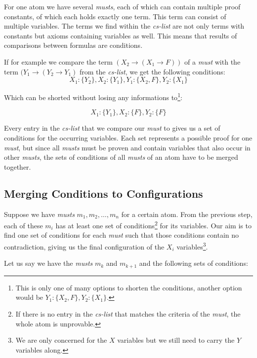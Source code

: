 For one atom we have several \emph{musts}, each of which can contain multiple proof constants, of which each holds exactly one term. This term can consist of multiple variables. The terms we find within the \emph{cs-list} are not only terms with constants but axioms containing variables as well. This means that results of comparisons between formulas are conditions. 

If for example we compare the term $(X_2 \rightarrow (X_1 \rightarrow F))$ of a \emph{must} with the term $(Y_1 \rightarrow (Y_2 \rightarrow Y_1)$ from the \emph{cs-list}, we get the following conditions:
\begin{equation*}
	X_1 : \{Y_2\}, X_2 : \{Y_1\}, Y_1 : \{X_2, F\}, Y_2 : \{X_1\} 
\end{equation*}

Which can be shorted without losing any informations to\footnote{This is only one of many options to shorten the conditions, another option would be $Y_1: \{X_2, F\}, Y_2:\{X_1\}$.}:

\begin{equation*}
	X_1 : \{Y_1\}, X_2 : \{F\}, Y_2 : \{F\}
\end{equation*}

Every entry in the \emph{cs-list} that we compare our \emph{must} to gives us a set of conditions for the occurring variables. Each set represents a possible proof for one \emph{must}, but since all \emph{musts} must be proven and contain variables that also occur in other \emph{musts}, the sets of conditions of all \emph{musts} of an atom have to be merged together.

\subsection{Merging Conditions to Configurations}
Suppose we have \emph{musts} $m_1, m_2, \dots, m_n$ for a certain atom. From the previous step, each of these $m_i$ has at least one set of conditions\footnote{If there is no entry in the \emph{cs-list} that matches the criteria of the \emph{must}, the whole atom is unprovable.} for its variables. Our aim is to find one set of conditions for each \emph{must} such that those conditions contain no contradiction, giving us the final configuration of the $X_i$ variables\footnote{We are only concerned for the $X$ variables but we still need to carry the $Y$ variables along.}.

Let us say we have the \emph{musts} $m_k$ and $m_{k+1}$ and the following sets of conditions: 

